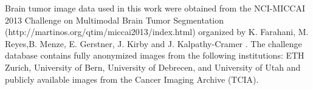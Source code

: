 \documentclass[10pt,twocolumn,letterpaper]{article}
\begin{document}
{\small


Brain tumor image data used in this work were obtained from the NCI-MICCAI 2013 Challenge on Multimodal Brain Tumor Segmentation (http://martinos.org/qtim/miccai2013/index.html) organized by K. Farahani, M. Reyes,B. Menze, E. Gerstner, J. Kirby and J. Kalpathy-Cramer . The challenge database contains fully anonymized images from the following institutions: ETH Zurich, University of Bern, University of Debrecen, and University of Utah and publicly available images from the Cancer Imaging Archive (TCIA).
}
\end{document}
